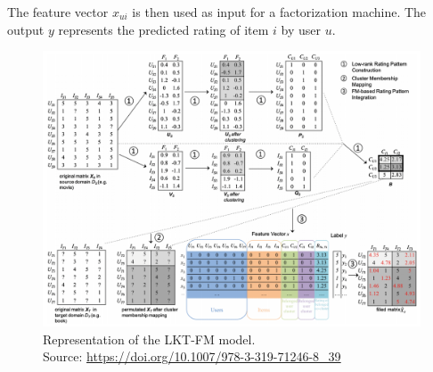 The feature vector $x_{ui}$ is then used as input for a factorization machine. The output $y$ represents the predicted rating of item $i$ by user $u$.
\begin{figure}[hbt]
\centering
\includegraphics[width=\textwidth]{pictures/lkt-fm}
\caption{Representation of the LKT-FM model.\\
Source: \url{https://doi.org/10.1007/978-3-319-71246-8\_39}}
\end{figure}